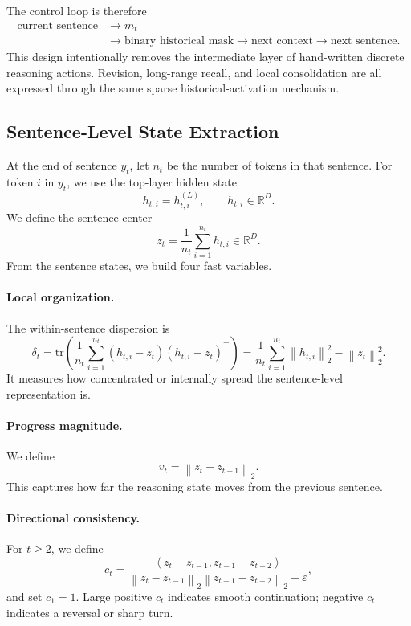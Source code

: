 \documentclass{article}
\newcommand{\R}{\mathbb{R}}
\newcommand{\norm}[1]{\left\lVert #1 \right\rVert}
\newcommand{\inner}[2]{\left\langle #1, #2 \right\rangle}
\newcommand{\tr}{\mathrm{tr}}
\newcommand{\eps}{\varepsilon}
\begin{document}
The control loop is therefore
\[
\begin{aligned}
\text{current sentence}
&\rightarrow m_t \\
&\rightarrow \text{binary historical mask}
\rightarrow \text{next context}
\rightarrow \text{next sentence}.
\end{aligned}
\]
This design intentionally removes the intermediate layer of hand-written discrete reasoning actions. Revision, long-range recall, and local consolidation are all expressed through the same sparse historical-activation mechanism.

\subsection{Sentence-Level State Extraction}
\label{sec:state}
At the end of sentence $y_t$, let $n_t$ be the number of tokens in that sentence. For token $i$ in $y_t$, we use the top-layer hidden state
\begin{equation}
 h_{t,i}=h_{t,i}^{(L)}, \qquad h_{t,i}\in\R^D.
\label{eq:hti}
\end{equation}
We define the sentence center
\begin{equation}
 z_t=\frac{1}{n_t}\sum_{i=1}^{n_t} h_{t,i} \in \R^D.
\label{eq:zt2}
\end{equation}
From the sentence states, we build four fast variables.

\paragraph{Local organization.}
The within-sentence dispersion is
\begin{equation}
\delta_t = \tr\!\left(\frac{1}{n_t}\sum_{i=1}^{n_t}(h_{t,i}-z_t)(h_{t,i}-z_t)^\top\right)
= \frac{1}{n_t}\sum_{i=1}^{n_t}\norm{h_{t,i}}_2^2-\norm{z_t}_2^2.
\label{eq:delta2}
\end{equation}
It measures how concentrated or internally spread the sentence-level representation is.

\paragraph{Progress magnitude.}
We define
\begin{equation}
 v_t = \norm{z_t-z_{t-1}}_2.
\label{eq:vt2}
\end{equation}
This captures how far the reasoning state moves from the previous sentence.

\paragraph{Directional consistency.}
For $t\ge 2$, we define
\begin{equation}
 c_t = \frac{\inner{z_t-z_{t-1}}{z_{t-1}-z_{t-2}}}{\norm{z_t-z_{t-1}}_2\norm{z_{t-1}-z_{t-2}}_2+\eps},
\label{eq:ct2}
\end{equation}
and set $c_1=1$. Large positive $c_t$ indicates smooth continuation; negative $c_t$ indicates a reversal or sharp turn.
\end{document}
